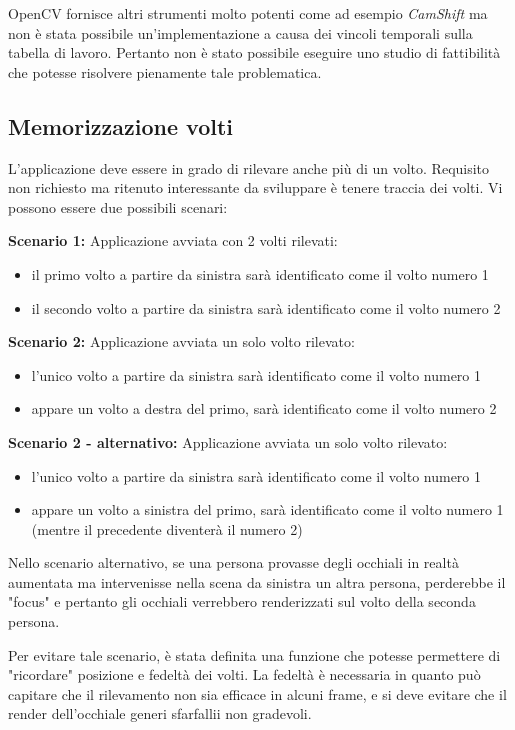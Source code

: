 OpenCV fornisce altri strumenti molto potenti come ad esempio \textit{CamShift} ma non è stata possibile un'implementazione a causa dei vincoli temporali sulla tabella di lavoro. Pertanto non è stato possibile eseguire uno studio di fattibilità che potesse risolvere pienamente tale problematica. 


\newpage
\subsection{Memorizzazione volti}

L'applicazione deve essere in grado di rilevare anche più di un volto. Requisito non richiesto ma ritenuto interessante da sviluppare è tenere traccia dei volti.
	Vi possono essere due possibili scenari:
	
	\textbf{Scenario 1:} Applicazione avviata con 2 volti rilevati:
	\begin{itemize}
	\item il primo volto a partire da sinistra sarà identificato come il volto numero 1
	\item il secondo volto a partire da sinistra sarà identificato come il volto numero 2
	\end{itemize}
	
	\textbf{Scenario 2:} Applicazione avviata un solo volto rilevato:
	\begin{itemize}
	\item l'unico volto a partire da sinistra sarà identificato come il volto numero 1
	\item appare un volto a destra del primo, sarà identificato come il volto numero 2
	\end{itemize}
	
	\textbf{Scenario 2 - alternativo:} Applicazione avviata un solo volto rilevato:
	\begin{itemize}
	\item l'unico volto a partire da sinistra sarà identificato come il volto numero 1
	\item appare un volto a sinistra del primo, sarà identificato come il volto numero 1 (mentre il precedente diventerà il numero 2)
	\end{itemize}
	
	Nello scenario alternativo, se una persona provasse degli occhiali in realtà aumentata ma intervenisse nella scena da sinistra un altra persona, perderebbe il "focus" e pertanto gli occhiali verrebbero renderizzati sul volto della seconda persona. 
	
	Per evitare tale scenario, è stata definita una funzione che potesse permettere di "ricordare" posizione e fedeltà dei volti. La fedeltà è necessaria in quanto può capitare che il rilevamento non sia efficace in alcuni frame, e si deve evitare che il render dell'occhiale generi sfarfallii non gradevoli.

